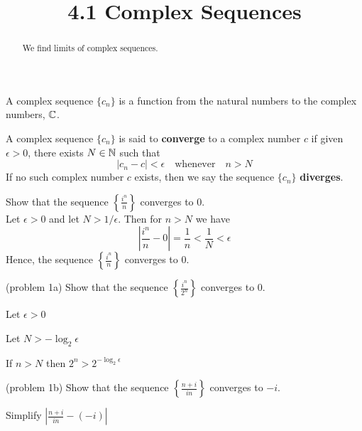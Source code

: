 \documentclass[handout]{ximera}
\title{4.1 Complex Sequences}
\begin{document}
\begin{abstract}
We find limits of complex sequences.
\end{abstract}

\maketitle


\begin{definition} 
A complex sequence $\{c_n\}$ is a function from the natural numbers to the complex numbers, $\mathbb C$.
\end{definition}

\begin{definition}
A complex sequence $\{c_n\}$ is said to {\bf converge} to a complex number $c$ if given $\epsilon >0$, there exists $N \in \mathbb N$
such that 
\[
|c_n - c| < \epsilon \quad \text{whenever} \quad n>N
\]
If no such complex number $c$ exists, then we say the sequence $\{c_n\}$ {\bf diverges}.
\end{definition}

 

\begin{example}[example 1]
Show that the sequence $\displaystyle \left\{\frac{i^n}{n}\right\}$ converges to $0$.\\
Let $\epsilon >0$ and let $N > 1/\epsilon$. Then for $n> N$ we have
\[
\left|\frac{i^n}{n} -0\right| = \frac{1}{n} < \frac{1}{N} < \epsilon
\]
Hence, the sequence $\displaystyle \left\{\frac{i^n}{n}\right\}$ converges to $0$.
\end{example}

\begin{problem}(problem 1a)
Show that the sequence $\displaystyle \left\{\frac{i^n}{2^n}\right\}$ converges to $0$.
\begin{hint}
Let $\epsilon >0$
\end{hint}
\begin{hint}
Let $N > -\log_2\epsilon$
\end{hint}
\begin{hint}
If $n>N$ then $2^n > 2^{-\log_2\epsilon}$
\end{hint}
\end{problem}

\begin{problem}(problem 1b)
Show that the sequence $\displaystyle \left\{\frac{n+i}{in}\right\}$ converges to $-i$.
\begin{hint}
Simplify $\displaystyle \left|\frac{n+i}{in} - (-i) \right|$
\end{hint}
\end{problem}
\end{document}
